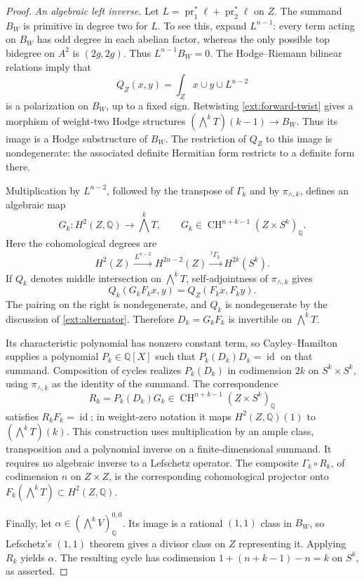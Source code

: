 \documentclass[11pt]{amsart}
\newcommand{\Q}{\mathbb Q}
\DeclareMathOperator{\CH}{CH}
\DeclareMathOperator{\id}{id}
\theoremstyle{definition}
\theoremstyle{remark}
\numberwithin{equation}{section}
\begin{document}
\begin{proof}
\emph{An algebraic left inverse.}
Let $L=\operatorname{pr}_1^*\ell+\operatorname{pr}_2^*\ell$ on $Z$.
The summand $B_W$ is primitive in degree two for $L$.  To see this,
expand $L^{n-1}$: every term acting on $B_W$ has odd degree in each
abelian factor, whereas the only possible top bidegree on $A^2$ is
$(2g,2g)$.  Thus $L^{n-1}B_W=0$.  The Hodge--Riemann bilinear
relations imply that
\[
 Q_Z(x,y)=\int_Zx\cup y\cup L^{n-2}
\]
is a polarization on $B_W$, up to a fixed sign.  Retwisting
\eqref{ext:forward-twist} gives a morphism of weight-two Hodge structures
$(\bigwedge^kT)(k-1)\to B_W$.  Thus its image is a Hodge substructure
of $B_W$.  The restriction of $Q_Z$ to this image is nondegenerate: the
associated definite Hermitian form restricts to a definite form
there.

Multiplication by $L^{n-2}$, followed by the transpose of
$\Gamma_k$ and by $\pi_{\wedge,k}$, defines an algebraic map
\begin{equation}\label{ext:adjoint}
 G_k:H^2(Z,\Q)\longrightarrow\bigwedge^kT,\qquad
 G_k\in\CH^{n+k-1}(Z\times S^k)_{\Q}.
\end{equation}
Here the cohomological degrees are
\[
 H^2(Z)\xrightarrow{\,L^{n-2}\,}H^{2n-2}(Z)
       \xrightarrow{\,{}^t\Gamma_k\,}H^{2k}(S^k).
\]
If $Q_k$ denotes middle intersection on $\bigwedge^kT$,
self-adjointness of $\pi_{\wedge,k}$ gives
\begin{equation}\label{ext:adjoint-identity}
 Q_k(G_kF_kx,y)=Q_Z(F_kx,F_ky).
\end{equation}
The pairing on the right is nondegenerate, and $Q_k$ is
nondegenerate by the discussion of \eqref{ext:alternator}.
Therefore $D_k=G_kF_k$ is invertible on $\bigwedge^kT$.

Its characteristic polynomial has nonzero constant term, so
Cayley--Hamilton supplies a polynomial $P_k\in\Q[X]$ such that
$P_k(D_k)D_k=\id$ on that summand.  Composition of cycles realizes
$P_k(D_k)$ in codimension $2k$ on $S^k\times S^k$, using
$\pi_{\wedge,k}$ as the identity of the summand.  The correspondence
\begin{equation}\label{ext:left-inverse}
 R_k=P_k(D_k)G_k\in\CH^{n+k-1}(Z\times S^k)_{\Q}
\end{equation}
satisfies $R_kF_k=\id$; in weight-zero notation it maps
$H^2(Z,\Q)(1)$ to $(\bigwedge^kT)(k)$.  This construction uses
multiplication by an ample class, transposition and a polynomial
inverse on a finite-dimensional summand.  It requires no algebraic
inverse to a Lefschetz operator.
The composite $\Gamma_k\circ R_k$, of codimension $n$ on
$Z\times Z$, is the corresponding cohomological projector onto
$F_k(\bigwedge^kT)\subset H^2(Z,\Q)$.

Finally, let $\alpha\in(\bigwedge^kV)^{0,0}_{\Q}$.  Its image is a
rational $(1,1)$ class in $B_W$, so Lefschetz's $(1,1)$ theorem gives
a divisor class on $Z$ representing it.  Applying $R_k$ yields
$\alpha$.  The resulting cycle has codimension
$1+(n+k-1)-n=k$ on $S^k$, as asserted.
\end{proof}
\end{document}
